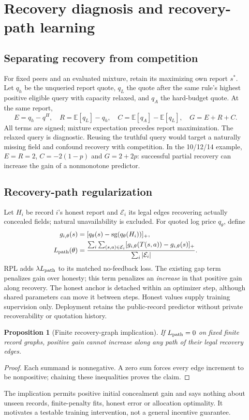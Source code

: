 \documentclass[11pt]{article}
\newtheorem{proposition}{Proposition}
\begin{document}
\section{Recovery diagnosis and recovery-path learning}\label{sec:recovery}
\subsection{Separating recovery from competition}
For fixed peers and an evaluated mixture, retain its maximizing own report
$s^*$. Let $q_h$ be the unqueried report quote, $q_L$ the quote after the
same rule's highest positive eligible query with capacity relaxed, and $q_A$
the hard-budget quote. At the same report,
\[
 E=q_h-q^H,\quad R=\mathbb E[q_L]-q_h,\quad
 C=\mathbb E[q_A]-\mathbb E[q_L],\quad G=E+R+C.
\]
All terms are signed; mixture expectation precedes report maximization.
The relaxed query is diagnostic. Reusing the truthful query would target a
naturally missing field and confound recovery with competition. In the
10/12/14 example, $E=R=2$, $C=-2(1-p)$ and $G=2+2p$: successful partial
recovery can increase the gain of a nonmonotone predictor.

\subsection{Recovery-path regularization}\label{sec:rpl_method}
Let $H_i$ be record $i$'s honest report and $\mathcal E_i$ its legal edges
recovering actually concealed fields; natural unavailability is excluded.
For quoted log price $q_\theta$, define
\begin{align}
 g_{i,\theta}(s)&=[q_\theta(s)-\operatorname{sg}(q_\theta(H_i))]_+,\\
 L_{\rm path}(\theta)&=\frac{\sum_i\sum_{(s,a)\in\mathcal E_i}
 [g_{i,\theta}(T(s,a))-g_{i,\theta}(s)]_+}
 {\sum_i|\mathcal E_i|}.\label{eq:rpl}
\end{align}
RPL adds $\lambda L_{\rm path}$ to its matched no-feedback loss. The existing
gap term penalizes gain over honesty; this term penalizes an \emph{increase}
in that positive gain along recovery. The honest anchor is detached within
an optimizer step, although shared parameters can move it between steps.
Honest values supply training supervision only. Deployment retains the
public-record predictor without private recoverability or quotation history.

\begin{proposition}[Finite recovery-graph implication]\label{prop:rpl}
If $L_{\rm path}=0$ on fixed finite record graphs, positive gain cannot increase
along any path of their legal recovery edges.
\end{proposition}
\begin{proof}
Each summand is nonnegative. A zero sum forces every edge increment to be
nonpositive; chaining these inequalities proves the claim.
\end{proof}
The implication permits positive initial concealment gain and says nothing
about unseen records, finite-penalty fits, honest error or allocation optimality.
It motivates a testable training intervention, not a general incentive guarantee.
\end{document}
